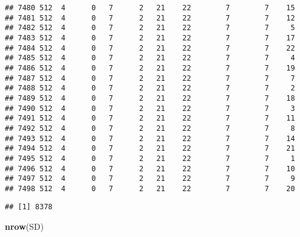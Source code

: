 \documentclass[]{article}
\newenvironment{Shaded}{\begin{snugshade}}{\end{snugshade}}
\newcommand{\KeywordTok}[1]{\textcolor[rgb]{0.13,0.29,0.53}{\textbf{#1}}}
\newcommand{\DataTypeTok}[1]{\textcolor[rgb]{0.13,0.29,0.53}{#1}}
\newcommand{\DecValTok}[1]{\textcolor[rgb]{0.00,0.00,0.81}{#1}}
\newcommand{\StringTok}[1]{\textcolor[rgb]{0.31,0.60,0.02}{#1}}
\newcommand{\OperatorTok}[1]{\textcolor[rgb]{0.81,0.36,0.00}{\textbf{#1}}}
\newcommand{\NormalTok}[1]{#1}
\begin{document}
\begin{verbatim}
## 7480 512  4      0   7      2   21    22        7        7    15
## 7481 512  4      0   7      2   21    22        7        7    12
## 7482 512  4      0   7      2   21    22        7        7     5
## 7483 512  4      0   7      2   21    22        7        7    17
## 7484 512  4      0   7      2   21    22        7        7    22
## 7485 512  4      0   7      2   21    22        7        7     4
## 7486 512  4      0   7      2   21    22        7        7    19
## 7487 512  4      0   7      2   21    22        7        7     7
## 7488 512  4      0   7      2   21    22        7        7     2
## 7489 512  4      0   7      2   21    22        7        7    18
## 7490 512  4      0   7      2   21    22        7        7     3
## 7491 512  4      0   7      2   21    22        7        7    11
## 7492 512  4      0   7      2   21    22        7        7     8
## 7493 512  4      0   7      2   21    22        7        7    14
## 7494 512  4      0   7      2   21    22        7        7    21
## 7495 512  4      0   7      2   21    22        7        7     1
## 7496 512  4      0   7      2   21    22        7        7    10
## 7497 512  4      0   7      2   21    22        7        7     9
## 7498 512  4      0   7      2   21    22        7        7    20
\end{verbatim}

\begin{Shaded}
\end{Shaded}

\begin{verbatim}
## [1] 8378
\end{verbatim}

\begin{Shaded}
\begin{Highlighting}[]
\KeywordTok{nrow}\NormalTok{(SD)}
\end{Highlighting}
\end{Shaded}
\end{document}

